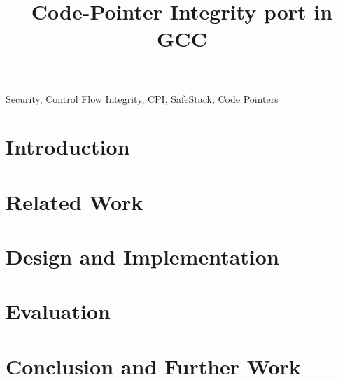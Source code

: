 \documentclass[conference]{IEEEtran}
\begin{document}
\title{Code-Pointer Integrity port in GCC}

\author{
}

\maketitle

\begin{abstract}

\end{abstract}


\begin{IEEEkeywords}
Security, Control Flow Integrity, CPI, SafeStack, Code Pointers
\end{IEEEkeywords}


\section{Introduction}
\label{sec:introduction}


\section{Related Work}
\label{sec:relatedwork}


\section{Design and Implementation}
\label{sec:design}


\section{Evaluation}
\label{sec:results}


\section{Conclusion and Further Work}
\label{sec:conclusion}

%
%



\end{document}
